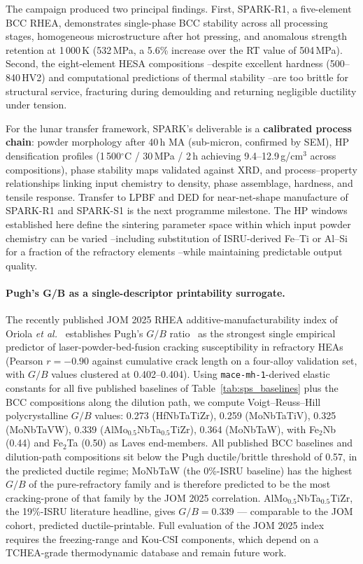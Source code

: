 \documentclass[11pt,a4paper]{article}
\begin{document}
The campaign produced two principal findings. First, SPARK-R1, a five-element BCC RHEA, demonstrates single-phase BCC stability across all processing stages, homogeneous microstructure after hot pressing, and anomalous strength retention at 1\,000\,K (532\,MPa, a 5.6\% increase over the RT value of 504\,MPa). Second, the eight-element HESA compositions --despite excellent hardness (500--840\,HV2) and computational predictions of thermal stability --are too brittle for structural service, fracturing during demoulding and returning negligible ductility under tension.

For the lunar transfer framework, SPARK's deliverable is a \textbf{calibrated process chain}: powder morphology after 40\,h MA (sub-micron, confirmed by SEM), HP densification profiles (1\,500$^\circ$C / 30\,MPa / 2\,h achieving 9.4--12.9\,g/cm$^3$ across compositions), phase stability maps validated against XRD, and process--property relationships linking input chemistry to density, phase assemblage, hardness, and tensile response. Transfer to LPBF and DED for near-net-shape manufacture of SPARK-R1 and SPARK-S1 is the next programme milestone. The HP windows established here define the sintering parameter space within which input powder chemistry can be varied --including substitution of ISRU-derived Fe--Ti or Al--Si for a fraction of the refractory elements --while maintaining predictable output quality.

\paragraph{Pugh's G/B as a single-descriptor printability surrogate.}
The recently published JOM 2025 RHEA additive-manufacturability index of Oriola \emph{et al.}~\cite{Oriola2025AMI,Oriola2025LaserGlazing} establishes Pugh's $G/B$ ratio~\cite{Pugh1954} as the strongest single empirical predictor of laser-powder-bed-fusion cracking susceptibility in refractory HEAs (Pearson $r = -0.90$ against cumulative crack length on a four-alloy validation set, with $G/B$ values clustered at 0.402--0.404). Using \texttt{mace-mh-1}-derived elastic constants for all five published baselines of Table~\ref{tab:sps_baselines} plus the BCC compositions along the dilution path, we compute Voigt--Reuss--Hill polycrystalline $G/B$ values: 0.273 (HfNbTaTiZr), 0.259 (MoNbTaTiV), 0.325 (MoNbTaVW), 0.339 (AlMo$_{0.5}$NbTa$_{0.5}$TiZr), 0.364 (MoNbTaW), with Fe$_2$Nb (0.44) and Fe$_2$Ta (0.50) as Laves end-members. All published BCC baselines and dilution-path compositions sit below the Pugh ductile/brittle threshold of 0.57, in the predicted ductile regime; MoNbTaW (the 0\%-ISRU baseline) has the highest $G/B$ of the pure-refractory family and is therefore predicted to be the most cracking-prone of that family by the JOM 2025 correlation. AlMo$_{0.5}$NbTa$_{0.5}$TiZr, the 19\%-ISRU literature headline, gives $G/B = 0.339$ --- comparable to the JOM cohort, predicted ductile-printable. Full evaluation of the JOM 2025 index requires the freezing-range and Kou-CSI components, which depend on a TCHEA-grade thermodynamic database and remain future work.
\end{document}
